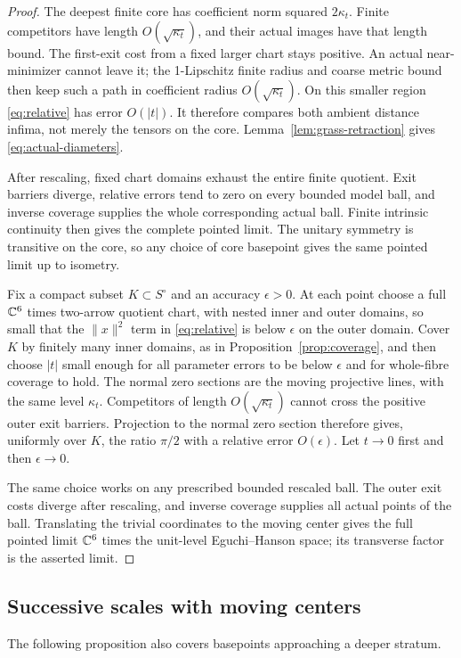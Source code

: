 \begin{proof}
The deepest finite core has coefficient norm squared \(2\kappa_t\).
Finite competitors have length \(O(\sqrt{\kappa_t})\), and
their actual images have that length bound. The first-exit
cost from a fixed larger chart stays positive. An actual
near-minimizer cannot leave it; the 1-Lipschitz finite radius
and coarse metric bound then keep such a path in coefficient
radius \(O(\sqrt{\kappa_t})\).
On this smaller region \eqref{eq:relative} has error \(O(|t|)\).
It therefore compares both ambient distance infima, not merely
the tensors on the core. Lemma~\ref{lem:grass-retraction} gives
\eqref{eq:actual-diameters}.

After rescaling, fixed chart domains exhaust the entire finite
quotient. Exit barriers diverge, relative errors tend to zero
on every bounded model ball, and inverse coverage supplies the
whole corresponding actual ball. Finite intrinsic continuity
then gives the complete pointed limit. The unitary symmetry is
transitive on the core, so any choice of core basepoint gives
the same pointed limit up to isometry.

Fix a compact subset \(K\subset S^\circ\) and an accuracy
\(\epsilon>0\). At each point choose a full \(\mathbb C^6\) times
two-arrow quotient chart, with nested inner and outer domains,
so small that the \(\|x\|^2\) term in \eqref{eq:relative}
is below \(\epsilon\) on the outer domain. Cover \(K\) by
finitely many inner domains, as in Proposition~\ref{prop:coverage},
and then choose \(|t|\) small enough for all parameter errors
to be below \(\epsilon\) and for whole-fibre coverage to hold.
The normal zero sections are the moving projective lines,
with the same level \(\kappa_t\). Competitors of length
\(O(\sqrt{\kappa_t})\) cannot cross the positive outer exit
barriers. Projection to the normal zero section therefore gives,
uniformly over \(K\), the ratio \(\pi/2\) with a relative
error \(O(\epsilon)\). Let \(t\to0\) first and then
\(\epsilon\to0\).

The same choice works on any prescribed bounded rescaled ball.
The outer exit costs diverge after rescaling, and inverse
coverage supplies all actual points of the ball. Translating
the trivial coordinates to the moving center gives the full
pointed limit \(\mathbb C^6\) times the unit-level Eguchi--Hanson
space; its transverse factor is the asserted limit.
\end{proof}

\subsection{Successive scales with moving centers}\label{subsec:successive}
The following proposition also covers basepoints approaching a
deeper stratum.


